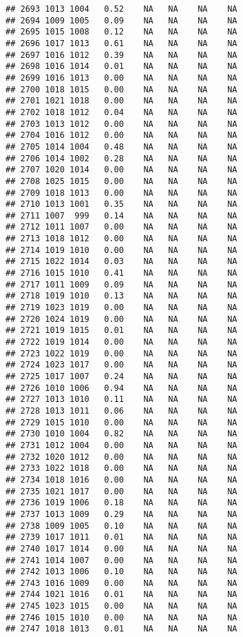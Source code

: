 \documentclass{article}\usepackage{graphicx, color}
\makeatletter
\newenvironment{kframe}{%
 \def\at@end@of@kframe{}%
 \ifinner\ifhmode%
  \def\at@end@of@kframe{\end{minipage}}%
  \begin{minipage}{\columnwidth}%
 \fi\fi%
 \def\FrameCommand##1{\hskip\@totalleftmargin \hskip-\fboxsep
 \colorbox{shadecolor}{##1}\hskip-\fboxsep
     \hskip-\linewidth \hskip-\@totalleftmargin \hskip\columnwidth}%
 \MakeFramed {\advance\hsize-\width
   \@totalleftmargin\z@ \linewidth\hsize
   \@setminipage}}%
 {\par\unskip\endMakeFramed%
 \at@end@of@kframe}
\newenvironment{knitrout}{}{} %
\makeatother
\begin{document}
\begin{knitrout}
\begin{kframe}
\begin{verbatim}
## 2693 1013 1004   0.52    NA   NA    NA    NA
## 2694 1009 1005   0.09    NA   NA    NA    NA
## 2695 1015 1008   0.12    NA   NA    NA    NA
## 2696 1017 1013   0.61    NA   NA    NA    NA
## 2697 1016 1012   0.39    NA   NA    NA    NA
## 2698 1016 1014   0.01    NA   NA    NA    NA
## 2699 1016 1013   0.00    NA   NA    NA    NA
## 2700 1018 1015   0.00    NA   NA    NA    NA
## 2701 1021 1018   0.00    NA   NA    NA    NA
## 2702 1018 1012   0.04    NA   NA    NA    NA
## 2703 1013 1012   0.00    NA   NA    NA    NA
## 2704 1016 1012   0.00    NA   NA    NA    NA
## 2705 1014 1004   0.48    NA   NA    NA    NA
## 2706 1014 1002   0.28    NA   NA    NA    NA
## 2707 1020 1014   0.00    NA   NA    NA    NA
## 2708 1025 1015   0.00    NA   NA    NA    NA
## 2709 1018 1013   0.00    NA   NA    NA    NA
## 2710 1013 1001   0.35    NA   NA    NA    NA
## 2711 1007  999   0.14    NA   NA    NA    NA
## 2712 1011 1007   0.00    NA   NA    NA    NA
## 2713 1018 1012   0.00    NA   NA    NA    NA
## 2714 1019 1010   0.00    NA   NA    NA    NA
## 2715 1022 1014   0.03    NA   NA    NA    NA
## 2716 1015 1010   0.41    NA   NA    NA    NA
## 2717 1011 1009   0.09    NA   NA    NA    NA
## 2718 1019 1010   0.13    NA   NA    NA    NA
## 2719 1023 1019   0.00    NA   NA    NA    NA
## 2720 1024 1019   0.00    NA   NA    NA    NA
## 2721 1019 1015   0.01    NA   NA    NA    NA
## 2722 1019 1014   0.00    NA   NA    NA    NA
## 2723 1022 1019   0.00    NA   NA    NA    NA
## 2724 1023 1017   0.00    NA   NA    NA    NA
## 2725 1017 1007   0.24    NA   NA    NA    NA
## 2726 1010 1006   0.94    NA   NA    NA    NA
## 2727 1013 1010   0.11    NA   NA    NA    NA
## 2728 1013 1011   0.06    NA   NA    NA    NA
## 2729 1015 1010   0.00    NA   NA    NA    NA
## 2730 1010 1004   0.82    NA   NA    NA    NA
## 2731 1012 1004   0.00    NA   NA    NA    NA
## 2732 1020 1012   0.00    NA   NA    NA    NA
## 2733 1022 1018   0.00    NA   NA    NA    NA
## 2734 1018 1016   0.00    NA   NA    NA    NA
## 2735 1021 1017   0.00    NA   NA    NA    NA
## 2736 1019 1006   0.18    NA   NA    NA    NA
## 2737 1013 1009   0.29    NA   NA    NA    NA
## 2738 1009 1005   0.10    NA   NA    NA    NA
## 2739 1017 1011   0.01    NA   NA    NA    NA
## 2740 1017 1014   0.00    NA   NA    NA    NA
## 2741 1014 1007   0.00    NA   NA    NA    NA
## 2742 1013 1006   0.10    NA   NA    NA    NA
## 2743 1016 1009   0.00    NA   NA    NA    NA
## 2744 1021 1016   0.01    NA   NA    NA    NA
## 2745 1023 1015   0.00    NA   NA    NA    NA
## 2746 1015 1010   0.00    NA   NA    NA    NA
## 2747 1018 1013   0.01    NA   NA    NA    NA

\end{verbatim}
\end{kframe}
\end{knitrout}
\end{document}
